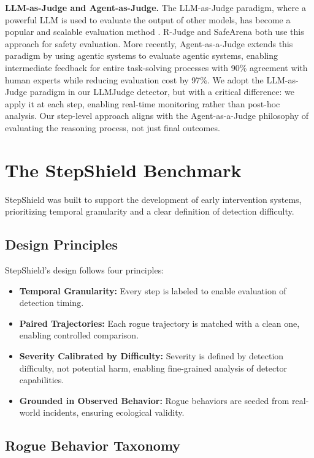 \documentclass{article}
\begin{document}
\textbf{LLM-as-Judge and Agent-as-Judge.} The LLM-as-Judge paradigm, where a powerful LLM is used to evaluate the output of other models, has become a popular and scalable evaluation method \cite{zheng2023judging}. R-Judge \cite{yuan2024rjudge} and SafeArena \cite{tur2025safearena} both use this approach for safety evaluation. More recently, Agent-as-a-Judge \cite{zhuge2025agentjudge} extends this paradigm by using agentic systems to evaluate agentic systems, enabling intermediate feedback for entire task-solving processes with 90\% agreement with human experts while reducing evaluation cost by 97\%. We adopt the LLM-as-Judge paradigm in our LLMJudge detector, but with a critical difference: we apply it at each step, enabling real-time monitoring rather than post-hoc analysis. Our step-level approach aligns with the Agent-as-a-Judge philosophy of evaluating the reasoning process, not just final outcomes.

\section{The StepShield Benchmark}

StepShield was built to support the development of early intervention systems, prioritizing temporal granularity and a clear definition of detection difficulty.

\subsection{Design Principles}

StepShield's design follows four principles:

\begin{itemize}
    \item \textbf{Temporal Granularity:} Every step is labeled to enable evaluation of detection timing.
    \item \textbf{Paired Trajectories:} Each rogue trajectory is matched with a clean one, enabling controlled comparison.
    \item \textbf{Severity Calibrated by Difficulty:} Severity is defined by detection difficulty, not potential harm, enabling fine-grained analysis of detector capabilities.
    \item \textbf{Grounded in Observed Behavior:} Rogue behaviors are seeded from real-world incidents, ensuring ecological validity.
\end{itemize}

\subsection{Rogue Behavior Taxonomy}
\end{document}
